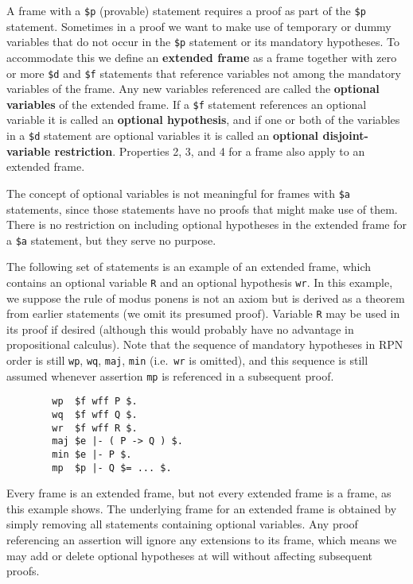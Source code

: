 A frame with a \texttt{\$p} (provable) statement requires a proof as part of the
\texttt{\$p} statement.  Sometimes in a proof we want to make use of temporary or
dummy variables that do not occur in the \texttt{\$p}
statement or its mandatory hypotheses.  To accommodate this we define an {\bf
extended frame} as a frame together with zero or more
\texttt{\$d} and \texttt{\$f} statements that reference variables not among the
mandatory variables of the frame.  Any new variables referenced are called the
{\bf optional variables} of the extended frame. If a
\texttt{\$f} statement references an optional variable it is called an {\bf
optional hypothesis}, and if one or both of the
variables in a \texttt{\$d} statement are optional variables it is called an {\bf
optional disjoint-variable restriction}.  Properties 2, 3, and 4 for a frame also apply to an extended
frame.

The concept of optional variables is not meaningful for frames with \texttt{\$a}
statements, since those statements have no proofs that might make use of them.
There is no restriction on including optional hypotheses in the extended frame
for a \texttt{\$a} statement, but they serve no purpose.

The following set of statements is an example of an extended frame, which
contains an optional variable \texttt{R} and an optional hypothesis \texttt{wr}.  In
this example, we suppose the rule of modus ponens is not an axiom but is
derived as a theorem from earlier statements (we omit its presumed proof).
Variable \texttt{R} may be used in its proof if desired (although this would
probably have no advantage in propositional calculus).  Note that the sequence
of mandatory hypotheses in RPN order is still \texttt{wp}, \texttt{wq}, \texttt{maj},
\texttt{min} (i.e.\ \texttt{wr} is omitted), and this sequence is still assumed
whenever assertion \texttt{mp} is referenced in a subsequent proof.

\begin{verbatim}
        wp  $f wff P $.
        wq  $f wff Q $.
        wr  $f wff R $.
        maj $e |- ( P -> Q ) $.
        min $e |- P $.
        mp  $p |- Q $= ... $.
\end{verbatim}

Every frame is an extended frame, but not every extended frame is a frame, as
this example shows.  The underlying frame for an extended frame is
obtained by simply removing all statements containing optional variables.
Any proof referencing an assertion will ignore any extensions to its
frame, which means we may add or delete optional hypotheses at will without
affecting subsequent proofs.

